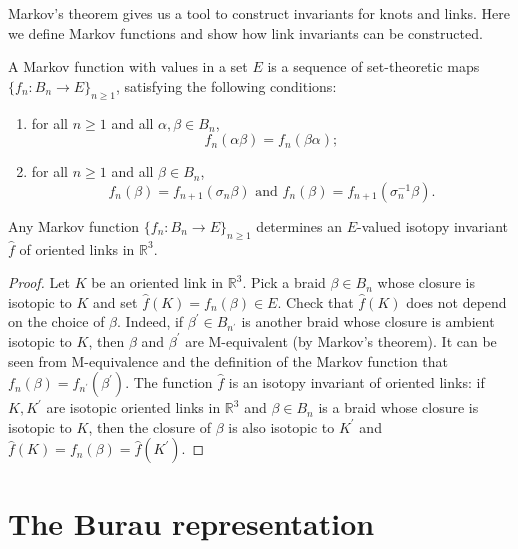 Markov's theorem gives us a tool to construct invariants for knots and links. Here we define Markov functions and show how link invariants can be constructed.

  \begin{definition}
  A Markov function with values in a set $E$ is a sequence of set-theoretic maps $\{ f_n: B_n \to E \}_{n\geq 1}$, satisfying the following conditions: 
\begin{enumerate}
\item\label{item:13} for all $n \geq 1$ and all $\alpha, \beta \in B_n$, 
\begin{displaymath}
f_n(\alpha \beta ) = f_n (\beta \alpha);
\end{displaymath} 
\item\label{item:14} for all $n \geq 1$ and all $\beta \in B_n$, 
\begin{displaymath}
f_n(\beta) = f_{n+1}(\sigma_n \beta) \text{ and } f_n(\beta) = f_{n+1}(\sigma_n^{-1} \beta).
\end{displaymath}
\end{enumerate}
\end{definition}

\begin{theorem}
  \label{markovisotopy}
  Any Markov function $\{ f_n : B_n \to E \}_{n \geq 1}$ determines an $E$-valued isotopy invariant $\hat{f}$ of oriented links in $\mathbb{R}^3$.
\end{theorem}
\begin{proof}
  Let $K$ be an oriented link in $\mathbb{R}^3$. Pick a braid $\beta \in B_n$ whose closure is isotopic to $K$ and set $\hat{f}(K) = f_n(\beta) \in E$. Check that $\hat{f}(K)$ does not depend on the choice of $\beta$. Indeed, if $\beta^{\prime} \in B_{n^{\prime}}$ is another braid whose closure is ambient isotopic to $K$, then $\beta$ and $\beta^{\prime}$ are M-equivalent (by Markov's theorem). It can be seen from M-equivalence and the definition of the Markov function that $f_n(\beta) = f_{n^{\prime}}(\beta^{\prime})$. The function $\hat{f}$ is an isotopy invariant of oriented links: if $K, K^{\prime}$ are isotopic oriented links in $\mathbb{R}^3$ and $\beta \in B_n$ is a braid whose closure is isotopic to $K$, then the closure of $\beta$ is also isotopic to $K^{\prime}$ and $\hat{f}(K) = f_n(\beta) = \hat{f}(K^{\prime})$.
\end{proof}

\section{The Burau representation}

